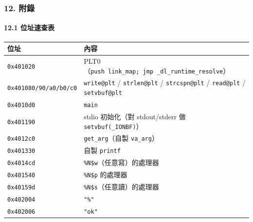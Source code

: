 \documentclass[10pt,a4paper]{article}
\newcounter{none}
\begin{document}
\subsubsection{12. 附錄}\label{ux9644ux9304}

\paragraph{12.1 位址速查表}\label{ux4f4dux5740ux901fux67e5ux8868}

{\def\LTcaptype{none} %
\begin{longtable}[]{@{}
  >{\raggedright\arraybackslash}p{}
  >{\raggedright\arraybackslash}p{}@{}}
\toprule\noalign{}
\begin{minipage}[b]{\linewidth}\raggedright
位址
\end{minipage} & \begin{minipage}[b]{\linewidth}\raggedright
內容
\end{minipage} \\
\midrule\noalign{}
\endhead
\bottomrule\noalign{}
\endlastfoot
\texttt{0x401020} &
PLT0（\texttt{push\ \allowbreak{}link\_\allowbreak{}map;\ \allowbreak{}jmp\ \allowbreak{}\_\allowbreak{}dl\_\allowbreak{}runtime\_\allowbreak{}resolve}） \\
\texttt{0x401080/\allowbreak{}90/\allowbreak{}a0/\allowbreak{}b0/\allowbreak{}c0} & \texttt{write@plt} / \texttt{strlen@plt}
/ \texttt{strcspn@plt} / \texttt{read@plt} / \texttt{setvbuf@plt} \\
\texttt{0x4010d0} & \texttt{main} \\
\texttt{0x401190} & stdio 初始化（對 stdout/stderr 做
\texttt{setvbuf(\_\allowbreak{}IONBF)}） \\
\texttt{0x4012c0} & \texttt{get\_\allowbreak{}arg}（自製 \texttt{va\_\allowbreak{}arg}） \\
\texttt{0x401330} & 自製 \texttt{printf} \\
\texttt{0x4014cd} & \texttt{\%\allowbreak{}N\$\allowbreak{}w}（任意寫）的處理器 \\
\texttt{0x401540} & \texttt{\%\allowbreak{}N\$\allowbreak{}p} 的處理器 \\
\texttt{0x40159d} & \texttt{\%\allowbreak{}N\$\allowbreak{}s}（任意讀）的處理器 \\
\texttt{0x402004} & \texttt{"\%\allowbreak{}"} \\
\texttt{0x402006} & \texttt{"ok"} \\

\end{longtable}}
\end{document}
